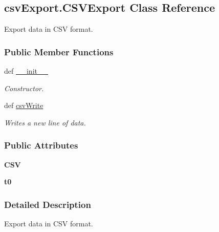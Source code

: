 \hypertarget{classcsv_export_1_1_c_s_v_export}{\subsection{csv\-Export.\-C\-S\-V\-Export Class Reference}
\label{classcsv_export_1_1_c_s_v_export}
}


Export data in C\-S\-V format.  


\subsubsection*{Public Member Functions}
\begin{DoxyCompactItemize}
\item 
def \hyperlink{classcsv_export_1_1_c_s_v_export_ac878a5b6f1169cc205547656c00e64d5}{\-\_\-\-\_\-init\-\_\-\-\_\-}
\begin{DoxyCompactList}\small\item\em Constructor. \end{DoxyCompactList}\item 
def \hyperlink{classcsv_export_1_1_c_s_v_export_a5b5e890619df75ddc137184f59036d09}{csv\-Write}
\begin{DoxyCompactList}\small\item\em Writes a new line of data. \end{DoxyCompactList}\end{DoxyCompactItemize}
\subsubsection*{Public Attributes}
\begin{DoxyCompactItemize}
\item 
\hypertarget{classcsv_export_1_1_c_s_v_export_ae6d8f4d693e9421b2e317def0815719e}{{\bfseries C\-S\-V}}\label{classcsv_export_1_1_c_s_v_export_ae6d8f4d693e9421b2e317def0815719e}

\item 
\hypertarget{classcsv_export_1_1_c_s_v_export_a8b226cc63eecae0145db1a0c6975c870}{{\bfseries t0}}\label{classcsv_export_1_1_c_s_v_export_a8b226cc63eecae0145db1a0c6975c870}

\end{DoxyCompactItemize}


\subsubsection{Detailed Description}
Export data in C\-S\-V format. 

